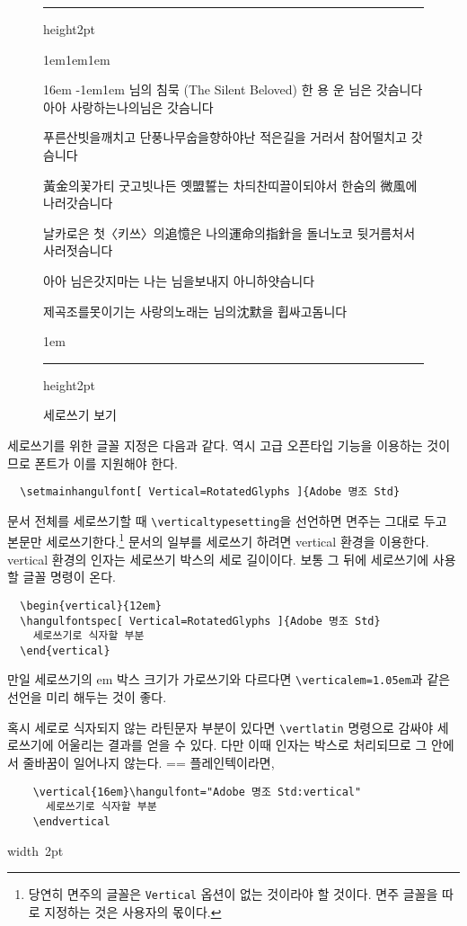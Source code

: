 \documentclass[a4paper]{article}
\def\grayhrule{{\color{white!80!black}\hrule height2pt}}
\def\grayvrule{{\color{white!80!black}\vrule width 2pt}}
\newenvironment{plaintex}
  {\setbox0=\vbox\bgroup\hsize=\dimexpr\textwidth-12pt\relax\medbreak\small}
  {\medbreak\egroup \par\medskip
    \ifdim\ht0<\dimexpr\pagegoal-\pagetotal\relax
      \hbox{\grayvrule\kern10pt\box0}%
    \else
      \setbox2=\vsplit0 to\dimexpr\pagegoal-\pagetotal\relax
      \lineskip=0pt
      \ifvoid2 \else\hbox{\grayvrule\kern10pt\box2}\fi
      \ifvoid0 \else\hbox{\grayvrule\kern10pt\box0}\fi
    \fi \par\medskip }
\newenvironment{example}
  {\hbox\bgroup\grayvrule
    \vbox\bgroup\hsize\dimexpr\textwidth-4pt\relax
    \grayhrule\kern1em\leftskip1em\rightskip1em
  }{\par\kern1em\grayhrule\egroup\grayvrule\egroup}
\def\cs#1{\texttt{\textbackslash #1}}
\begin{document}
\begin{figure}
\begin{example}
\hfil\begin{vertical}{16em}
  \hangulmarks \hanjabyhangulfont \parindent-1em\leftskip1em
  \disablecjksymbolspacing
\noindent 님의 침묵 {\small(The Silent Beloved)}
\smallbreak
\hfil\hfil 한 용 운\hfil
\bigbreak
님은 갓슴니다 아아 사랑하는나의님은 갓슴니다\par
푸른산빗을깨치고 단풍나무숩을향하야난 적은길을 거러서 참어떨치고 갓슴니다\par
黃金의꽃가티 굿고빗나든 옛盟誓는 차듸찬띠끌이되야서 한숨의 微風에 나러갓슴니다\par
날카로은 첫〈키쓰〉의追憶은 나의運命의指針을 돌너노코 뒷거름처서 사러젓슴니다\par
\hellipsis\par
아아 님은갓지마는 나는 님을보내지 아니하얏슴니다\par
제곡조를못이기는 사랑의노래는 님의沈默을 휩싸고돔니다\par
\end{vertical}\hfil
\end{example}
\caption{세로쓰기 보기}\label{fig:vertical}
\end{figure}

세로쓰기를 위한 글꼴 지정은 다음과 같다.
역시 고급 오픈타입 기능을 이용하는 것이므로
폰트가 이를 지원해야 한다.
\begin{verbatim}
  \setmainhangulfont[ Vertical=RotatedGlyphs ]{Adobe 명조 Std}
\end{verbatim}
문서 전체를 세로쓰기할 때 \cs{verticaltypesetting}을 선언하면
면주는 그대로 두고 본문만 세로쓰기한다.\footnote{당연히 면주의 글꼴은
\texttt{Vertical} 옵션이 없는 것이라야 할 것이다.
면주 글꼴을 따로 지정하는 것은 사용자의 몫이다. }
문서의 일부를 세로쓰기 하려면 vertical 환경을 이용한다.
vertical 환경의 인자는 세로쓰기 박스의 세로 길이이다.
보통 그 뒤에  세로쓰기에 사용할 글꼴 명령이 온다.
\begin{verbatim}
  \begin{vertical}{12em}
  \hangulfontspec[ Vertical=RotatedGlyphs ]{Adobe 명조 Std}
    세로쓰기로 식자할 부분
  \end{vertical}
\end{verbatim}
만일 세로쓰기의 em 박스 크기가 가로쓰기와 다르다면
\cs{verticalem=1.05em}과 같은 선언을 미리 해두는 것이 좋다.

혹시 세로로 식자되지 않는 라틴문자 부분이 있다면
\cs{vertlatin} 명령으로 감싸야 세로쓰기에 어울리는
결과를 얻을 수 있다. 다만 이때 인자는 박스로 처리되므로
그 안에서 줄바꿈이 일어나지 않는다.
\medbreak
\begin{plaintex}
플레인텍이라면,
\begin{verbatim}
    \vertical{16em}\hangulfont="Adobe 명조 Std:vertical"
      세로쓰기로 식자할 부분
    \endvertical
\end{verbatim}
\end{plaintex}
\end{document}
